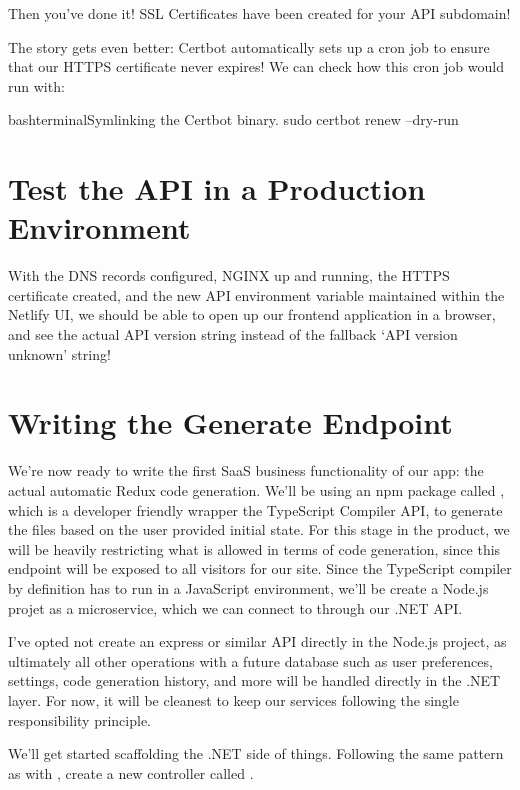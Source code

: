 \documentclass[a4paper,headinclude=on,footinclude=on,12pt,oneside]{scrbook}
\begin{document}
Then you've done it! SSL Certificates have been created for your API subdomain!

The story gets even better: Certbot automatically sets up a cron job to ensure that our HTTPS certificate never expires! We can check how this cron job would run with:

\begin{codeInput}{bash}{terminal}{Symlinking the Certbot binary.}
sudo certbot renew --dry-run
\end{codeInput}

\section{Test the API in a Production Environment}

With the DNS records configured, NGINX up and running, the HTTPS certificate created, and the new API environment variable maintained within the Netlify UI, we should be able to open up our frontend application in a browser, and see the actual API version string instead of the fallback `API version unknown' string!

\section{Writing the Generate Endpoint}

We're now ready to write the first SaaS business functionality of our app: the actual automatic Redux code generation. We'll be using an npm package called , which is a developer friendly wrapper the TypeScript Compiler API, to generate the files based on the user provided initial state. For this stage in the product, we will be heavily restricting what is allowed in terms of code generation, since this endpoint will be exposed to all visitors for our site. Since the TypeScript compiler by definition has to run in a JavaScript environment, we'll be create a Node.js projet as a microservice, which we can connect to through our .NET API. 

I've opted not create an express or similar API directly in the Node.js project, as ultimately all other operations with a future database such as user preferences, settings, code generation history, and more will be handled directly in the .NET layer. For now, it will be cleanest to keep our services following the single responsibility principle.


We'll get started scaffolding the .NET side of things. Following the same pattern as with , create a new controller called .
\end{document}
